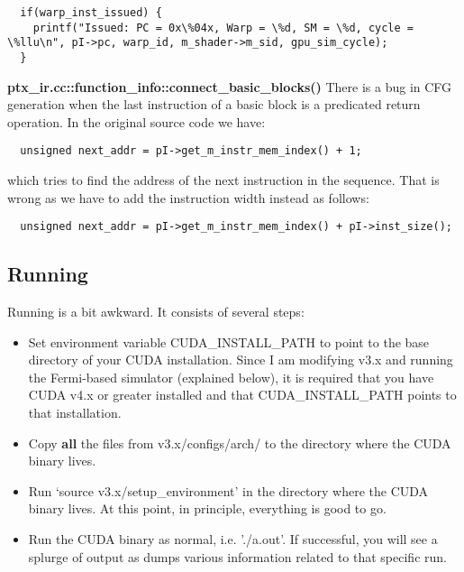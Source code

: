 \documentclass{article}
\begin{document}
\begin{lstlisting}
  if(warp_inst_issued) {
    printf("Issued: PC = 0x\%04x, Warp = \%d, SM = \%d, cycle = \%llu\n", pI->pc, warp_id, m_shader->m_sid, gpu_sim_cycle);
  }
\end{lstlisting}       

\textbf{ptx_ir.cc::function_info::connect_basic_blocks()} There is a bug in CFG generation when the last 
instruction of a basic block is a predicated return operation. In the original source code we have:

\begin{lstlisting}
  unsigned next_addr = pI->get_m_instr_mem_index() + 1;
\end{lstlisting}

which tries to find the address of the next instruction in the sequence. That is wrong as we have to 
add the instruction width instead as follows:
\begin{lstlisting}
  unsigned next_addr = pI->get_m_instr_mem_index() + pI->inst_size();
\end{lstlisting}

\subsection{Running}

Running \gpusim is a bit awkward. It consists of several steps:

\begin{itemize}
  \item Set environment variable CUDA\_INSTALL\_PATH to point to the base directory of your CUDA installation.
   Since I am modifying v3.x and running the Fermi-based simulator (explained below), it is required
   that you have CUDA v4.x or greater installed and that CUDA\_INSTALL\_PATH points to that installation. 

  \item Copy \textbf{all} the files from v3.x/configs/arch/ to the directory where the CUDA binary lives. 

  \item Run `source v3.x/setup\_environment' in the directory where the CUDA binary lives. At this point, in principle,
  everything is good to go.

  \item Run the CUDA binary as normal, i.e. './a.out'. If successful, you will see a splurge of output as \gpusim dumps
  various information related to that specific run.
\end{itemize}
\end{document}
